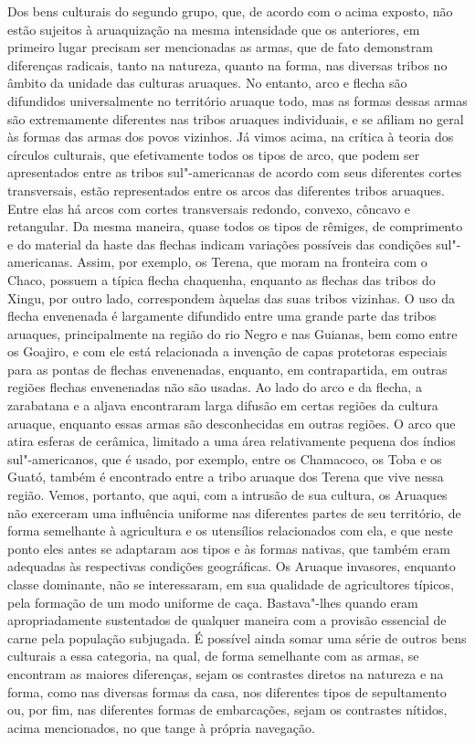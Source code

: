 Dos bens culturais do segundo grupo, que, de acordo com o acima exposto,
não estão sujeitos à aruaquização na mesma intensidade que os
anteriores, em primeiro lugar precisam ser mencionadas as armas, que de
fato demonstram diferenças radicais, tanto na natureza, quanto na
forma, nas diversas tribos no âmbito da unidade das culturas aruaques. No
entanto, arco e flecha são difundidos universalmente no território
aruaque todo, mas as formas dessas armas são extremamente diferentes nas
tribos aruaques individuais, e se afiliam no geral às formas das armas
dos povos vizinhos. Já vimos acima, na crítica à teoria dos círculos
culturais, que efetivamente todos os tipos de arco, que podem ser
apresentados entre as tribos sul"-americanas de acordo com seus
diferentes cortes transversais, estão representados entre os arcos das
diferentes tribos aruaques. Entre elas há arcos com cortes transversais
redondo, convexo, côncavo e retangular. Da mesma maneira, quase todos
os tipos de rêmiges, de comprimento e do material da haste das flechas
indicam variações possíveis das condições sul"-americanas. Assim, por
exemplo, os Terena, que moram na fronteira com o Chaco, possuem a típica
flecha chaquenha, enquanto as flechas das tribos do Xingu, por outro
lado, correspondem àquelas das suas tribos vizinhas. O uso da flecha
envenenada é largamente difundido entre uma grande parte das tribos
aruaques, principalmente na região do rio Negro e nas Guianas, bem como
entre os Goajiro, e com ele está relacionada a invenção de capas
protetoras especiais para as pontas de flechas envenenadas, enquanto,
em contrapartida, em outras regiões flechas envenenadas não são usadas.
Ao lado do arco e da flecha, a zarabatana e a aljava encontraram larga
difusão em certas regiões da cultura aruaque, enquanto essas armas são
desconhecidas em outras regiões. O arco que atira esferas de cerâmica,
limitado a uma área relativamente pequena dos índios sul"-americanos, que é usado,
por exemplo, entre os Chamacoco, os Toba e os Guató, também é encontrado
entre a tribo aruaque dos Terena que vive nessa região. Vemos, portanto,
que aqui, com a intrusão de sua cultura, os Aruaques não exerceram uma
influência uniforme nas diferentes partes de seu território, de forma
semelhante à agricultura e os utensílios relacionados com ela, e que
neste ponto eles antes se adaptaram aos tipos e às formas nativas, que
também eram adequadas às respectivas condições geográficas. Os Aruaque
invasores, enquanto classe dominante, não se interessaram, em sua
qualidade de agricultores típicos, pela formação de um modo uniforme de
caça. Bastava"-lhes quando eram apropriadamente sustentados de qualquer
maneira com a provisão essencial de carne pela população subjugada. É
possível ainda somar uma série de outros bens culturais a essa
categoria, na qual, de forma semelhante com as armas, se encontram as
maiores diferenças, sejam os contrastes diretos na natureza e na forma,
como nas diversas formas da casa, nos diferentes tipos de sepultamento
ou, por fim, nas diferentes formas de embarcações, sejam os contrastes
nítidos, acima mencionados, no que tange à própria navegação.

